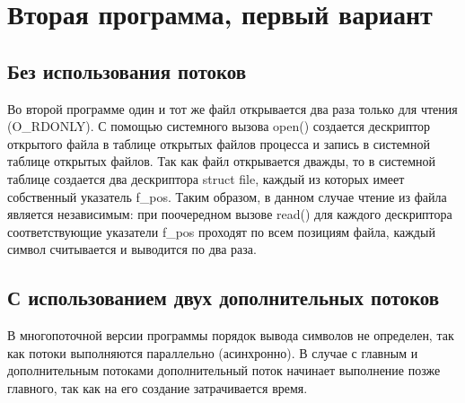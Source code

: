 
\clearpage

\section{Вторая программа, первый вариант}

\subsection{Без использования потоков}



Во второй программе один и тот же файл открывается два раза только для чтения (O\_RDONLY).
С помощью системного вызова open() создается дескриптор открытого файла в таблице открытых файлов процесса и запись в системной таблице открытых файлов.
Так как файл открывается дважды, то в системной таблице создается два дескриптора struct file, каждый из которых имеет собственный указатель f\_pos.
Таким образом, в данном случае чтение из файла является независимым: при поочередном вызове read() для каждого дескриптора соответствующие указатели f\_pos проходят по всем позициям файла, каждый символ считывается и выводится по два раза.


\clearpage

\subsection{С использованием двух дополнительных потоков}


\clearpage


В многопоточной версии программы порядок вывода символов не определен, так как потоки выполняются параллельно (асинхронно).
В случае с главным и дополнительным потоками дополнительный поток начинает выполнение позже главного, так как на его создание затрачивается время.

